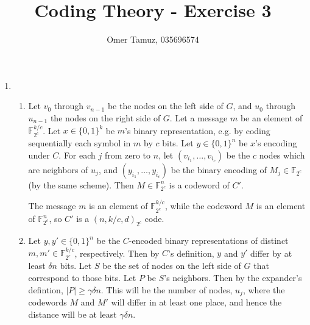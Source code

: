 \documentclass[11pt]{article} \usepackage{amssymb}
\begin{document}
\title{Coding Theory - Exercise 3}

 \author{Omer Tamuz, 035696574}
\maketitle

\begin{enumerate}
\item 
  \begin{enumerate}
  \item Let $v_0$ through $v_{n-1}$ be the nodes on the left side of $G$,
  and $u_0$ through $u_{n-1}$ the nodes on the right side of $G$. 
  Let a message $m$ be an element of $\mathbb{F}_{2^c}^{k/c}$.
  Let $x\in \{0,1\}^k$ be $m$'s binary representation, e.g. by coding
  sequentially each symbol in $m$ by $c$ bits.
  Let $y\in \{0,1\}^n$ be $x$'s encoding under $C$.
  For each $j$ from zero to $n$, 
  let $(v_{i_1},\ldots,v_{i_c})$ be the $c$ nodes which are neighbors 
  of $u_j$, and $(y_{i_1},\ldots,y_{i_c})$ be the binary
  encoding of $M_j\in \mathbb{F}_{2^c}$ (by the same scheme). Then $M\in \mathbb{F}_{2^c}^n$
  is a codeword of $C'$. 

  The message $m$ is an element of 
  $\mathbb{F}_{2^c}^{k/c}$, while the codeword $M$ is an element of
  $\mathbb{F}_{2^c}^n$, so $C'$ is a $(n,k/c,d)_{2^c}$ code.

  \item
  Let $y,y'\in \{0,1\}^n$ be the $C$-encoded binary representations of 
  distinct $m,m'\in \mathbb{F}_{2^c}^{k/c}$, respectively. Then by $C$'s definition, $y$ and $y'$
  differ by at least $\delta n$ bits. Let $S$ be the set of nodes on the left
  side of $G$ that correspond to those bits. Let $P$ be $S$'s neighbors.
  Then by the expander's defintion, $|P|\geq\gamma\delta n$. This will be the number
  of nodes, $u_j$, where the codewords $M$ and $M'$ will differ in at
  least one place, and hence the distance will be at least $\gamma\delta n$.
  

\end{enumerate}
\end{enumerate}
\end{document}

